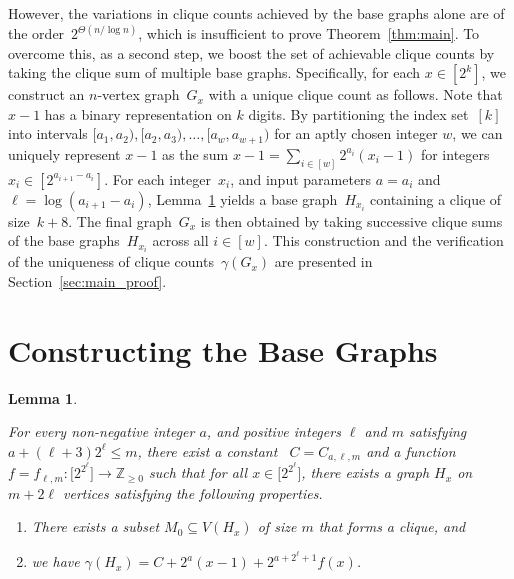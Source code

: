 \documentclass[11pt, final]{article}
\newtheorem{lemma}[theorem]{Lemma}
\theoremstyle{definition}
\begin{document}
However, the variations in clique counts achieved by the base graphs alone are of the order~$2^{\Theta(n/ \log n)}$, which is insufficient to prove Theorem~\ref{thm:main}. To overcome this, as a second step, we boost the set of achievable clique counts by taking the clique sum of multiple base graphs. 
Specifically, for each $x \in [2^k]$, we construct an $n$-vertex graph~$G_x$ with a unique clique count as follows. Note that $x-1$ has a binary representation on $k$ digits. By partitioning the index set~$[k]$ into intervals $[a_1, a_2), [a_2, a_3), \dots, [a_w, a_{w+1})$ for an aptly chosen integer $w$, we can uniquely represent $x - 1$ as the sum $x - 1 = \sum_{i \in [w]}2^{a_i}(x_i -1)$ for integers $x_i \in [2^{a_{i+1} - a_i}]$. For each integer~$x_i$, and input parameters $a = a_i$ and $\ell = \log (a_{i+1} - a_i)$, Lemma~\ref{q2} yields a base graph~$H_{x_i}$ containing a clique of size~$k+8$. The final graph~$G_x$ is then obtained by taking successive clique sums of the base graphs~$H_{x_i}$ across all $i \in [w]$. This construction and the verification of the uniqueness of clique counts~$\gamma(G_x)$ are presented in Section~\ref{sec:main_proof}.

\section{Constructing the Base Graphs}
\label{sec:Base_graph}

\begin{lemma}\label{q2}

For every non-negative integer $a$, and positive integers $\ell$ and $m$ satisfying $a + (\ell+3)2^\ell\leq m$, there exist a constant~ $C = C_{a,\ell,m}$ and a function~$f = f_{\ell,m}\colon \bigl[2^{2^\ell}\bigr]\to \mathbb{Z}_{\ge 0}$ such that for all $x
\in \bigl[2^{2^\ell}\bigr]$, there exists a graph $H_x$ on $m + 2\ell$ vertices satisfying the following properties.

\begin{enumerate}
    \item There exists a subset $M_0\subseteq V(H_x)$ of size $m$ that forms a clique, and 
    \item we have $\gamma(H_x)=C + 2^a (x-1) + 2^{a+2^\ell+1}f(x)$. \label{clique_number}
\end{enumerate}
\end{lemma}
\end{document}
